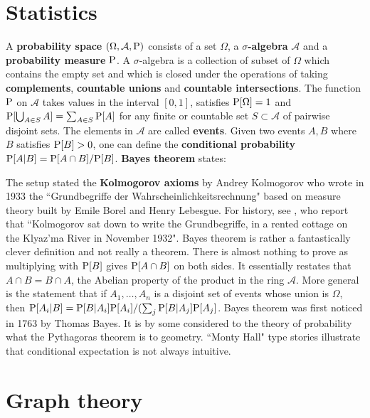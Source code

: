\documentclass[12pt]{amsart}
\def\satz#1{ \vspace{2mm} \begin{center} \fcolorbox{yellow1}{yellow1}{ \parbox{14.0cm}{{\bf Theorem:} #1}} \vspace{2mm} \end{center} }
\begin{document}
\section{Statistics}

A {\bf probability space} $(\Omega,\mathcal{A},{\rm P})$ consists of a set $\Omega$,
a {\bf $\sigma$-algebra} $\mathcal{A}$ and a {\bf probability measure} ${\rm P}$. A 
$\sigma$-algebra is a collection of subset of $\Omega$ which contains the empty set
and which is closed under the operations of taking {\bf complements}, {\bf countable unions} and
{\bf countable intersections}. The function ${\rm P}$ on $\mathcal{A}$ takes values in the
interval $[0,1]$, satisfies ${\rm P}[\Omega]=1$ and 
${\rm P}[ \bigcup_{A \in S} A ] = \sum_{A \in S} {\rm P}[A]$ for any finite or countable set 
$S \subset \mathcal{A}$ of pairwise disjoint sets. 
The elements in $\mathcal{A}$ are called {\bf events}. Given two events $A,B$ where
$B$ satisfies ${\rm P}[B]>0$, one can define the {\bf conditional probability} 
${\rm P}[A|B]={\rm P}[A \cap B]/{\rm P}[B]$. {\bf Bayes theorem} states:

\satz{${\rm P}[A|B] = {\rm P}[B|A] {\rm P}[A]/{\rm P}[B]$}

The setup stated the {\bf Kolmogorov axioms} by Andrey Kolmogorov who wrote in 1933 the ``Grundbegriffe der
Wahrscheinlichkeitsrechnung" \cite{Kolmogorov} based on measure theory built by Emile Borel and Henry Lebesgue. 
For history, see \cite{ShaferVovk}, who report that 
``Kolmogorov sat down to write the Grundbegriffe, in a rented cottage on the Klyaz'ma River in November 1932".
Bayes theorem is rather a fantastically clever definition and not really a theorem. 
There is almost nothing to prove as multiplying with ${\rm P}[B]$ gives ${\rm P}[A \cap B]$ on both sides. 
It essentially restates that $A \cap B = B \cap A$, the Abelian property of the product in the ring
$\mathcal{A}$. More general is the statement that if $A_1, \dots, A_n$ is a disjoint 
set of events whose union is $\Omega$, then 
${\rm P}[A_i|B] = {\rm P}[B|A_i] {\rm P}[A_i]/(\sum_j {\rm P}[B|A_j] {\rm P}[A_j]$.
Bayes theorem was first noticed in 1763 by Thomas Bayes. It is by some considered 
to the theory of probability what the Pythagoras theorem is to geometry.
``Monty Hall" type stories \cite{Rosenhouse} illustrate that conditional expectation is not always intuitive. 

\section{Graph theory}
\end{document}

